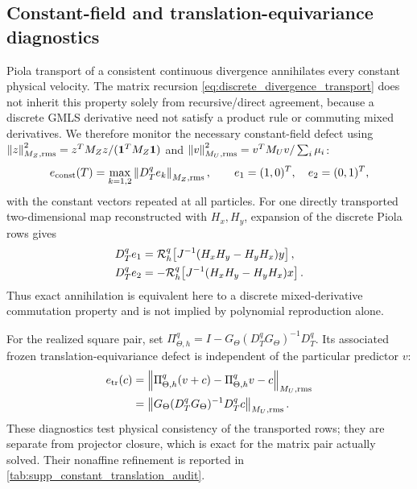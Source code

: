 \documentclass[11pt]{article}
\theoremstyle{plain}
\theoremstyle{definition}
\theoremstyle{remark}
\newcommand{\Th}{\Theta}
\newcommand{\norm}[2][]{\left\lVert #2\right\rVert_{#1}}
\begin{document}
\subsection{Constant-field and translation-equivariance diagnostics}
\label{sec:constant_field_diagnostics}

Piola transport of a consistent continuous divergence annihilates every
constant physical velocity.  The matrix recursion
\eqref{eq:discrete_divergence_transport} does not inherit this property solely
from recursive/direct agreement, because a discrete GMLS derivative need not
satisfy a product rule or commuting mixed derivatives.  We therefore monitor
the necessary constant-field defect
using
$\norm[M_Z,{\rm rms}]{z}^2=z^TM_Zz/(\bm1^TM_Z\bm1)$ and
$\norm[M_U,{\rm rms}]{v}^2=v^TM_Uv/\sum_i\mu_i$:
\begin{equation}
 e_{\rm const}(T)
 =\max_{k=1,2}\norm[M_Z,{\rm rms}]{D_T^qe_k},
 \qquad e_1=(1,0)^T,\quad e_2=(0,1)^T,
 \label{eq:constant_field_divergence_defect}
\end{equation}
with the constant vectors repeated at all particles.  For one directly
transported two-dimensional map reconstructed with $H_x,H_y$, expansion of
the discrete Piola rows gives
\begin{align}
 D_T^qe_1
 &=\mathcal R_h^q\!\left[J^{-1}(H_xH_y-H_yH_x)y\right],\notag\\
 D_T^qe_2
 &=-\mathcal R_h^q\!\left[J^{-1}(H_xH_y-H_yH_x)x\right].
 \label{eq:constant_field_commutator}
\end{align}
Thus exact annihilation is equivalent here to a discrete mixed-derivative
commutation property and is not implied by polynomial reproduction alone.

For the realized square pair, set
$\Pi_{\Th,h}^q=I-G_\Th(D_T^qG_\Th)^{-1}D_T^q$.  Its associated frozen
translation-equivariance defect is independent of the particular predictor
$v$:
\begin{equation}
 \begin{split}
 e_{\rm tr}(c)
 &=\norm[M_U,{\rm rms}]{\Pi_{\Th,h}^q(v+c)-\Pi_{\Th,h}^qv-c}\\
 &=\norm[M_U,{\rm rms}]{G_\Th(D_T^qG_\Th)^{-1}D_T^qc}.
 \end{split}
 \label{eq:frozen_translation_defect}
\end{equation}
These diagnostics test physical consistency of the transported rows; they are
separate from projector closure, which is exact for the matrix pair actually
solved.  Their nonaffine refinement is reported in
\cref{tab:supp_constant_translation_audit}.
\end{document}
